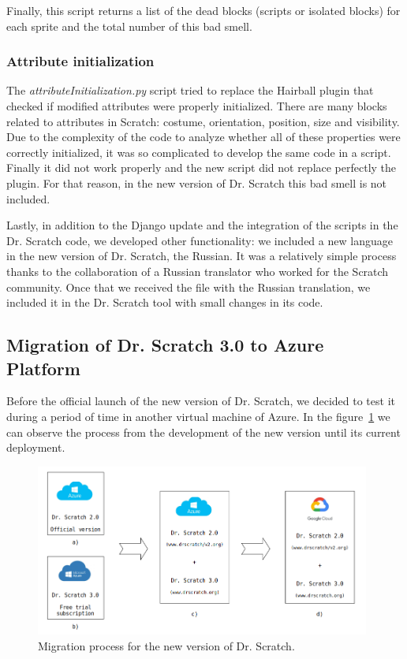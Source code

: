 Finally, this script returns a list of the dead blocks (scripts or isolated blocks) for each sprite and the total number of this bad smell.

\subsubsection{Attribute initialization}
\label{subsubsec:att_initialization}

The \textit{attributeInitialization.py} script tried to replace the Hairball plugin that checked if modified attributes were properly initialized. There are many blocks related to attributes in Scratch: costume, orientation, position, size and visibility. Due to the complexity of the code to analyze whether all of these properties were correctly initialized, it was so complicated to develop the same code in a script. Finally it did not work properly and the new script did not replace perfectly the plugin. For that reason, in the new version of Dr. Scratch this bad smell is not included.

\hfill

Lastly, in addition to the Django update and the integration of the scripts in the Dr. Scratch code, we developed other functionality: we included a new language in the new version of Dr. Scratch, the Russian. It was a relatively simple process thanks to the collaboration of a Russian translator who worked for the Scratch community. Once that we received the file with the Russian translation, we included it in the Dr. Scratch tool with small changes in its code.


\subsection{Migration of Dr. Scratch 3.0 to Azure Platform}
\label{subsec:mig_to_azure}

Before the official launch of the new version of Dr. Scratch, we decided to test it during a period of time in another virtual machine of Azure. In the figure~\ref{fig:migrations} we can observe the process from the development of the new version until its current deployment.

\begin{figure}
    \centering
    \includegraphics[width=11cm,                         keepaspectratio]{img/migrations.png}
    \caption{Migration process for the new version of Dr. Scratch.}
    \label{fig:migrations}
\end{figure}


